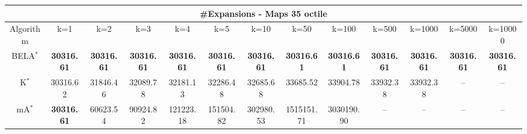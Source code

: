 \begin{tabular}{c|cccccccccccc}\toprule
\multicolumn{13}{c}{#Expansions - Maps 35 octile}\\ \midrule
Algorithm & k=1 & k=2 & k=3 & k=4 & k=5 & k=10 & k=50 & k=100 & k=500 & k=1000 & k=5000 & k=10000 \\ \midrule
BELA$^*$ & \textbf{30316.61} & \textbf{30316.61} & \textbf{30316.61} & \textbf{30316.61} & \textbf{30316.61} & \textbf{30316.61} & \textbf{30316.61} & \textbf{30316.61} & \textbf{30316.61} & \textbf{30316.61} & \textbf{30316.61} & \textbf{30316.61} \\
K$^*$ & 30316.62 & 31846.46 & 32089.78 & 32181.13 & 32286.48 & 32685.68 & 33685.52 & 33904.78 & 33932.38 & 33932.38 & -- & -- \\
mA$^*$ & \textbf{30316.61} & 60623.54 & 90924.82 & 121223.18 & 151504.82 & 302980.53 & 1515151.71 & 3030190.90 & -- & -- & -- & -- \\ \bottomrule 
\end{tabular}
